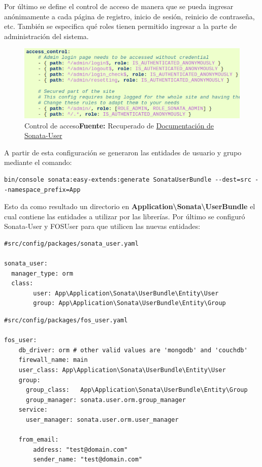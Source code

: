 \newpage
Por último se define el control de acceso de manera que se pueda ingresar anónimamente a cada página de registro, inicio de sesión, reinicio de contraseña,
etc.
También se especifica qué roles tienen permitido ingresar a la parte de administración del sistema.

\begin{figure}[h]
    \includegraphics[width=1\linewidth]{image/acl.png}
    \caption{Control de acceso\newline \textbf{Fuente:} Recuperado de \href{https://sonata-project.org/bundles/user/master/doc/reference/installation.html}{Documentación de Sonata-User}}
    \label{fig:image/acl}
\end{figure}


A partir de esta configuración se generaron las entidades de usuario y grupo mediante el comando:

\begin{lstlisting}
bin/console sonata:easy-extends:generate SonataUserBundle --dest=src --namespace_prefix=App
\end{lstlisting}


Esto da como resultado un directorio en \textbf{Application\textbackslash Sonata\textbackslash UserBundle} el cual contiene las entidades a utilizar por las librerías.
Por último se configuró Sonata-User y FOSUser para que utilicen las nuevas entidades:

\begin{lstlisting}[caption={Archivo de configuración de Sonata-User.}]
#src/config/packages/sonata_user.yaml

sonata_user:
  manager_type: orm
  class:
        user: App\Application\Sonata\UserBundle\Entity\User
        group: App\Application\Sonata\UserBundle\Entity\Group

\end{lstlisting}

\newpage
\begin{lstlisting}[caption=Archivo de configuración de FOSUser.]
#src/config/packages/fos_user.yaml

fos_user:
    db_driver: orm # other valid values are 'mongodb' and 'couchdb'
    firewall_name: main
    user_class: App\Application\Sonata\UserBundle\Entity\User
    group:
      group_class:   App\Application\Sonata\UserBundle\Entity\Group
      group_manager: sonata.user.orm.group_manager
    service:
      user_manager: sonata.user.orm.user_manager

    from_email:
        address: "test@domain.com"
        sender_name: "test@domain.com"

\end{lstlisting}

